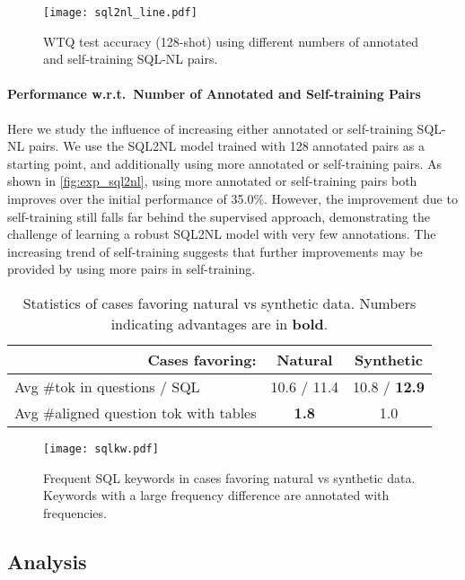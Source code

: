 \documentclass[11pt]{article}
\def\smallcol{\hskip 6pt}
\def\tinycol{\hskip 2pt}
\begin{document}
\begin{figure}[tb]
\centering
\texttt{[image: sql2nl\_line.pdf]}
\caption{WTQ test accuracy (128-shot) using different numbers of annotated and self-training SQL-NL pairs.}
\label{fig:exp_sql2nl}
\end{figure}

\paragraph{Performance w.r.t.~Number of Annotated and Self-training Pairs}
Here we study the influence of increasing either annotated or self-training SQL-NL pairs.
We use the SQL2NL model trained with 128 annotated pairs as a starting point, and additionally using more annotated or self-training pairs.
As shown in \autoref{fig:exp_sql2nl}, using more annotated or self-training pairs both improves over the initial performance of 35.0\%.
However, the improvement due to self-training still falls far behind the supervised approach, demonstrating the challenge of learning a robust SQL2NL model with very few annotations.
The increasing trend of self-training suggests that further improvements may be provided by using more pairs in self-training.

\begin{table}[tb]
\small
\centering
\begin{tabular}{@{}l@{\tinycol}c@{\smallcol}c@{}}
\toprule
\multicolumn{1}{r}{\textbf{Cases favoring:}} & \textbf{Natural} & \textbf{Synthetic} \\
\midrule
Avg \#tok in questions / SQL & 10.6 / 11.4 & 10.8 / \textbf{12.9} \\
Avg \#aligned question tok with tables & \textbf{1.8} & 1.0 \\
\bottomrule
\end{tabular}
\caption{Statistics of cases favoring natural vs synthetic data. Numbers indicating advantages are in \textbf{bold}.}
\label{tab:case_stat}
\end{table}

\begin{figure}[tb]
\centering
\texttt{[image: sqlkw.pdf]}
\caption{Frequent SQL keywords in cases favoring natural vs synthetic data. Keywords with a large frequency difference are annotated with frequencies.}
\label{fig:case_sqlkw}
\end{figure}

\subsection{Analysis}\label{sec:exp_analysis}
\end{document}

